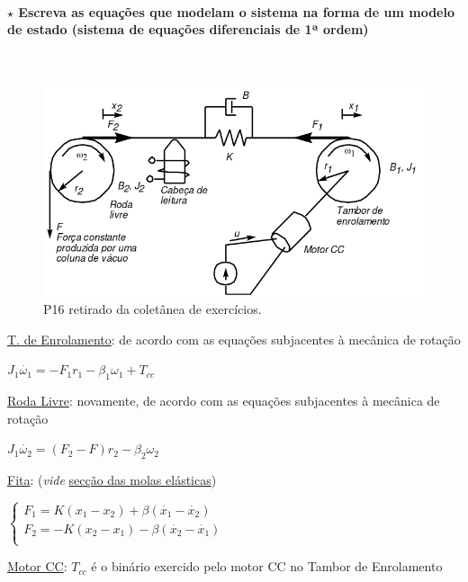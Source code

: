 \paragraph[2.2.3.1 Problema 1]{$\pmb{\star}$ Escreva as equações que modelam o sistema na forma de um modelo de estado (sistema
de equações diferenciais de 1ª ordem)}\mbox{}\\
\begin{figure}[H]
    \centering
    \includegraphics[width = 0.6\linewidth]{img/1/motor-cc-P16.png}
    \caption{P16 retirado da coletânea de exercícios.}
    \label{fig:motor-cc-P16}
\end{figure}

\noindent\underline{T. de Enrolamento}: de acordo com as equações subjacentes à mecânica de rotação

\noindent \hspace*{1.5 em}\raisebox{0.2 em}{$\drsh$} $J_1 \dot{\omega_1} = - F_1 r_1 - \beta_1 \omega_1 + T_{cc}$

\vspace{0.5em}
\noindent\underline{Roda Livre}: novamente, de acordo com as equações subjacentes à mecânica de rotação 

\noindent \hspace*{1.5 em}\raisebox{0.2 em}{$\drsh$} $J_1 \dot{\omega_2} = (F_2 - F) r_2 - \beta_2 \omega_2$

\vspace{0.5em}
\noindent\underline{Fita}: (\textit{vide} \hyperref[def:MolasElásticas]{secção das molas elásticas})

\noindent \hspace*{1.5 em}\raisebox{0.2 em}{$\drsh$} $
                \begin{cases}
                    F_1 = K(x_1 - x_2) + \beta(\dot{x_1} - \dot{x_2})\\
                    F_2 = -K(x_2 - x_1) - \beta(\dot{x_2} - \dot{x_1})\\
                \end{cases}
$

\vspace{0.5em}
\noindent\underline{Motor CC}: $T_{cc}$ é o binário exercido pelo motor CC no Tambor de Enrolamento

